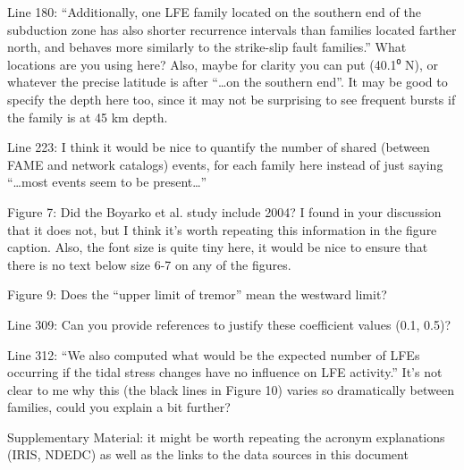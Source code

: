 \documentclass[letterpaper, 12pt]{article}
\begin{document}
Line 180: “Additionally, one LFE family located on the southern end of the subduction zone has also shorter recurrence intervals than families located farther north, and behaves more similarly to the strike-slip fault families.” What locations are you using here? Also, maybe for clarity you can put (40.1⁰ N), or whatever the precise latitude is after “…on the southern end”. It may be good to specify the depth here too, since it may not be surprising to see frequent bursts if the family is at 45 km depth. 

Line 223: I think it would be nice to quantify the number of shared (between FAME and network catalogs) events, for each family here instead of just saying “…most events seem to be present…” 

Figure 7: Did the Boyarko et al. study include 2004? I found in your discussion that it does not, but I think it’s worth repeating this information in the figure caption. Also, the font size is quite tiny here, it would be nice to ensure that there is no text below size 6-7 on any of the figures. 

Figure 9: Does the “upper limit of tremor” mean the westward limit? 

Line 309: Can you provide references to justify these coefficient values (0.1, 0.5)? 

Line 312: “We also computed what would be the expected number of LFEs occurring if the tidal stress changes have no influence on LFE activity.” It’s not clear to me why this (the black lines in Figure 10) varies so dramatically between families, could you explain a bit further? 

Supplementary Material: it might be worth repeating the acronym explanations (IRIS, NDEDC) as well as the links to the data sources in this document 
\end{document}
